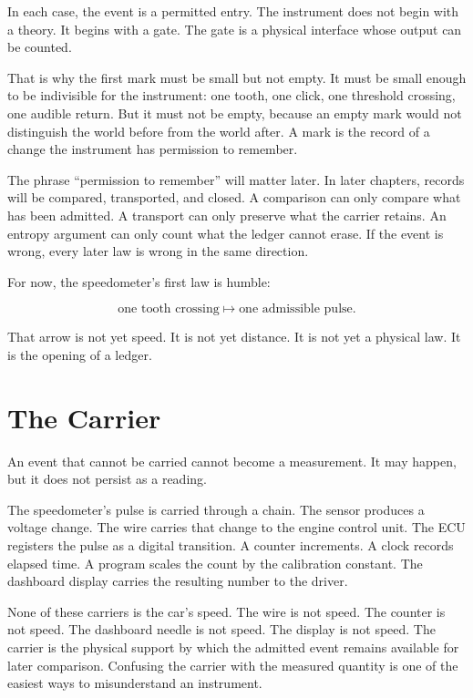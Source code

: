 In each case, the event is a permitted entry. The instrument does not begin with
a theory. It begins with a gate. The gate is a physical interface whose output
can be counted.

That is why the first mark must be small but not empty. It must be small enough
to be indivisible for the instrument: one tooth, one click, one threshold
crossing, one audible return. But it must not be empty, because an empty mark
would not distinguish the world before from the world after. A mark is the
record of a change the instrument has permission to remember.

The phrase ``permission to remember'' will matter later. In later chapters,
records will be compared, transported, and closed. A comparison can only compare
what has been admitted. A transport can only preserve what the carrier retains.
An entropy argument can only count what the ledger cannot erase. If the event is
wrong, every later law is wrong in the same direction.

For now, the speedometer's first law is humble:

\[
\text{one tooth crossing} \longmapsto \text{one admissible pulse}.
\]

That arrow is not yet speed. It is not yet distance. It is not yet a physical
law. It is the opening of a ledger.

\section{The Carrier}
\label{se:the-carrier}

An event that cannot be carried cannot become a measurement. It may happen, but
it does not persist as a reading.

The speedometer's pulse is carried through a chain. The sensor produces a
voltage change. The wire carries that change to the engine control unit. The ECU
registers the pulse as a digital transition. A counter increments. A clock
records elapsed time. A program scales the count by the calibration constant.
The dashboard display carries the resulting number to the driver.

None of these carriers is the car's speed. The wire is not speed. The counter is
not speed. The dashboard needle is not speed. The display is not speed. The
carrier is the physical support by which the admitted event remains available
for later comparison. Confusing the carrier with the measured quantity is one of
the easiest ways to misunderstand an instrument.

